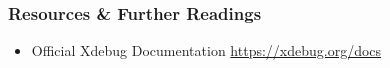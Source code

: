 \begin{frame}\frametitle{Resources \& Further Readings}
    \begin{itemize}
        \item Official Xdebug Documentation \href{https://xdebug.org/docs}{https://xdebug.org/docs}
    \end{itemize}
\end{frame}
